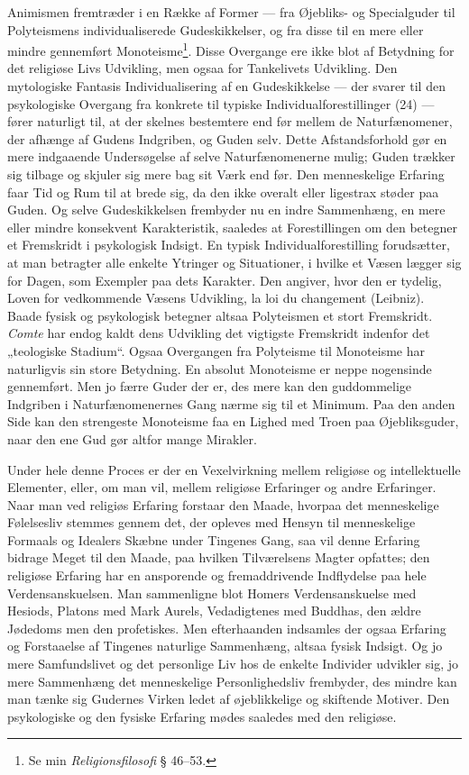\documentclass[12pt,a4paper]{book}
\newcommand{\apage}[1]{\marginnote{\footnotesize\textit{[#1]}}}
\begin{document}
\apage{115} Animismen fremtræder i en Række af Former --- fra Øjebliks- og
Specialguder til Polyteismens individualiserede Gudeskikkelser, og fra
disse til en mere eller mindre gennemført Monoteisme\footnote{Se min
\emph{Religionsfilosofi} § 46--53.}. Disse Overgange ere ikke blot af
Betydning for det religiøse Livs Udvikling, men ogsaa for Tankelivets
Udvikling. Den mytologiske Fantasis Individualisering af en Gudeskikkelse
--- der svarer til den psykologiske Overgang fra konkrete til typiske
Individualforestillinger (24) --- fører naturligt til, at der skelnes
bestemtere end før mellem de Naturfænomener, der afhænge af Gudens
Indgriben, og Guden selv. Dette Afstandsforhold gør en mere indgaaende
Undersøgelse af selve Naturfænomenerne mulig; Guden trækker sig tilbage
og skjuler sig mere bag sit Værk end før. Den menneskelige Erfaring faar
Tid og Rum til at brede sig, da den ikke overalt eller ligestrax støder
paa Guden. Og selve Gudeskikkelsen frembyder nu en indre Sammenhæng, en
mere eller mindre konsekvent Karakteristik, saaledes at Forestillingen om
den betegner et Fremskridt i psykologisk Indsigt. En typisk
Individualforestilling forudsætter, at man betragter alle enkelte
Ytringer og Situationer, i hvilke et Væsen lægger sig for Dagen, som
Exempler paa dets Karakter. Den angiver, hvor den er tydelig, Loven for
vedkommende Væsens Udvikling, la loi du changement (Leibniz). Baade
fysisk og psykologisk betegner altsaa Polyteismen et stort Fremskridt.
\emph{Comte} har endog kaldt dens Udvikling det vigtigste Fremskridt indenfor
det „teologiske Stadium“. Ogsaa Overgangen fra Polyteisme til Monoteisme
har naturligvis sin store Betydning. En absolut Monoteisme er neppe
nogensinde gennemført. Men jo færre Guder der er, des mere kan den
guddommelige Indgriben i Naturfænomenernes Gang nærme sig til et
Minimum. Paa den anden Side kan den strengeste Monoteisme faa en Lighed
med Troen paa Øjebliksguder, naar den ene Gud gør altfor mange Mirakler.

Under hele denne Proces er der en Vexelvirkning mellem religiøse og
intellektuelle Elementer, eller, om man vil, mellem religiøse Erfaringer
og andre Erfaringer. Naar man ved \apage{116} religiøs Erfaring forstaar den Maade,
hvorpaa det menneskelige Følelsesliv stemmes gennem det, der opleves med
Hensyn til menneskelige Formaals og Idealers Skæbne under Tingenes Gang,
saa vil denne Erfaring bidrage Meget til den Maade, paa hvilken
Tilværelsens Magter opfattes; den religiøse Erfaring har en ansporende
og fremaddrivende Indflydelse paa hele Verdensanskuelsen. Man sammenligne
blot Homers Verdensanskuelse med Hesiods, Platons med Mark Aurels,
Vedadigtenes med Buddhas, den ældre Jødedoms men den profetiskes. Men
efterhaanden indsamles der ogsaa Erfaring og Forstaaelse af Tingenes
naturlige Sammenhæng, altsaa fysisk Indsigt. Og jo mere Samfundslivet og
det personlige Liv hos de enkelte Individer udvikler sig, jo mere
Sammenhæng det menneskelige Personlighedsliv frembyder, des mindre kan
man tænke sig Gudernes Virken ledet af øjeblikkelige og skiftende
Motiver. Den psykologiske og den fysiske Erfaring mødes saaledes med den
religiøse.
\end{document}
